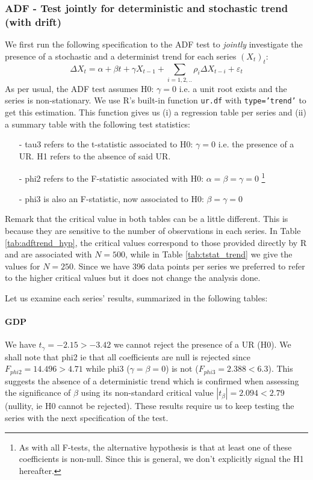 \documentclass[hidelinks,12pts]{article}
\DeclareMathOperator{\1}{\mathbbm{1}}
\begin{document}
\subsubsection{ADF - Test jointly for deterministic and stochastic trend (with drift)}

We first run the following specification to the ADF test to \emph{jointly} investigate the presence of a stochastic and a determinist trend for each series $(X_t)_t$: 
    \begin{equation}
        \Delta X_t = \alpha + \beta t + \gamma X_{t-1} +\sum_{i=1,2,..}\rho_i \Delta X_{t-i} + \varepsilon_t
    \end{equation}
As per usual, the ADF test assumes H0: $\gamma =0$ i.e. a unit root exists and the series is non-stationary.
We use R's built-in function \texttt{ur.df} with \texttt{type='trend'} to get this estimation. This function gives us (i) a regression table per series and (ii) a summary table with the following test statistics: 
    \begin{itemize}
        \item[-] tau3 refers to the t-statistic associated to H0: $\gamma =0$ i.e. the presence of a UR. H1 refers to the absence of said UR.
        \item[-] phi2 refers to the F-statistic associated with H0: $\alpha = \beta = \gamma =0$ \footnote{As with all F-tests, the alternative hypothesis is that at least one of these coefficients is non-null. Since this is general, we don't explicitly signal the H1 hereafter.}
        \item[-] phi3 is also an F-statistic, now associated to H0: $\beta =\gamma = 0$  
    \end{itemize}
Remark that the critical value in both tables can be a little different. This is because they are sensitive to the number of observations in each series. In Table \ref{tab:adftrend_hyp}, the critical values correspond to those provided directly by R and are associated with $N=500$, while in Table \ref{tab:tstat_trend} we give the values for $N=250$. Since we have 396 data points per series we preferred to refer to the higher critical values but it does not change the analysis done.

Let us examine each series' results, summarized in the following tables: 


%


\paragraph{GDP}
We have $t_\gamma = -2.15 > -3.42$ we cannot reject the presence of a UR (H0). 
We shall note that phi2 ie that all coefficients are null is rejected since $F_{phi2} = 14.496 > 4.71$ while phi3 ($\gamma = \beta =0$) is not ($F_{phi3} = 2.388 < 6.3$). 
This suggests the absence of a deterministic trend which is confirmed when assessing the significance of $\beta$ using its non-standard critical value $|t_\beta| = 2.094 < 2.79$ (nullity, ie H0 cannot be rejected). 
These results require us to keep testing the series with the next specification of the test. 
\end{document}

